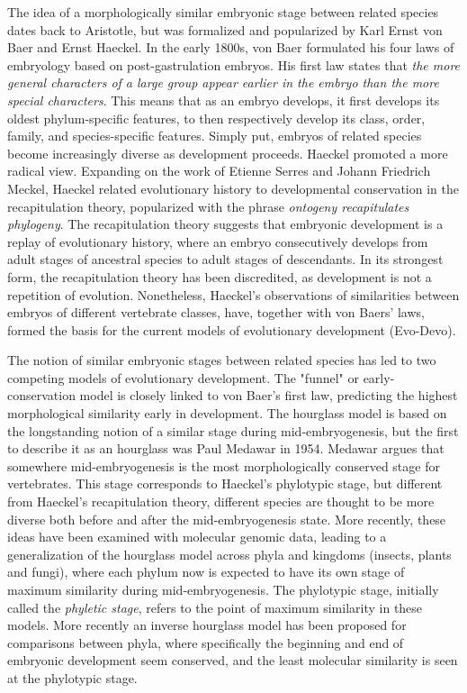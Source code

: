 The idea of a morphologically similar embryonic stage between related species dates back to Aristotle\cite{Aristotle1943}, but was formalized and popularized by Karl Ernst von Baer and Ernst Haeckel\cite{haeckel1866,baer1828}. In the early 1800s, von Baer formulated his four laws of embryology based on post-gastrulation embryos. His first law states that \textit{the more general characters of a large group appear earlier in the embryo than the more special characters}. This means that as an embryo develops, it first develops its oldest phylum-specific features, to then respectively develop its class, order, family, and species-specific features. Simply put, embryos of related species become increasingly diverse as development proceeds. Haeckel promoted a more radical view. Expanding on the work of Etienne Serres and Johann Friedrich Meckel, Haeckel related evolutionary history to developmental conservation in the recapitulation theory, popularized with the phrase \textit{ontogeny recapitulates phylogeny}. The recapitulation theory suggests that embryonic development is a replay of evolutionary history, where an embryo consecutively develops from adult stages of ancestral species to adult stages of descendants. In its strongest form, the recapitulation theory has been discredited, as development is not a repetition of evolution\cite{ehrlich1974}. Nonetheless, Haeckel's observations of similarities between embryos of different vertebrate classes, have, together with von Baers’ laws, formed the basis for the current models of evolutionary development (Evo-Devo).

The notion of similar embryonic stages between related species has led to two competing models of evolutionary development. The "funnel" or early-conservation model is closely linked to von Baer's first law, predicting the highest morphological similarity early in development. 
The hourglass model is based on the longstanding notion of a similar stage during mid-embryogenesis\cite{His1875}, but the first to describe it as an hourglass was Paul Medawar in 1954\cite{Medawar1954}. Medawar argues that somewhere mid-embryogenesis is the most morphologically conserved stage for vertebrates. This stage corresponds to Haeckel's phylotypic stage, but different from Haeckel's recapitulation theory, different species are thought to be more diverse both before and after the mid-embryogenesis state. More recently, these ideas have been examined with molecular genomic data, leading to a generalization of the hourglass model across phyla and kingdoms (insects\cite{Kalinka2010}, plants\cite{Quint2012} and fungi\cite{Cheng2015}), where each phylum now is expected to have its own stage of maximum similarity during mid-embryogenesis. The phylotypic stage, initially called the \textit{phyletic stage}, refers to the point of maximum similarity in these models\cite{Cohen1963, Seidel1960}. More recently an inverse hourglass model has been proposed for comparisons between phyla, where specifically the beginning and end of embryonic development seem conserved, and the least molecular similarity is seen at the phylotypic stage\cite{Levin2016}.

